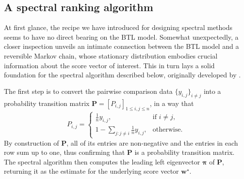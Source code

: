 %



\subsection{A spectral ranking algorithm \label{subsec:Spectral-method-for-ranking}}

At first glance, the recipe we have introduced for designing  spectral methods seems to have no direct bearing on the BTL model.
Somewhat unexpectedly, a closer inspection unveils an intimate connection between the BTL model and a reversible Markov chain,
whose stationary distribution embodies crucial information about the score vector of interest.
This in turn lays a solid foundation for the spectral algorithm described below, originally developed by \citet{negahban2016rank}.

The first step is to convert the pairwise comparison data
$\{y_{i,j}\}_{i\neq j}$ into a probability transition matrix $\bm{P}=[P_{i,j}]_{1\leq i,j\leq n}$, in a way that
%
\begin{equation}
P_{i,j}=\begin{cases}
\frac{1}{n}y_{i,j}, & \text{if }i\neq j,\\
1-\sum_{j:j\neq i}\frac{1}{n}y_{i,j}, & \text{otherwise}.
\end{cases}
\label{defn:ranking-P-empirical}
\end{equation}
%
By construction of $\bm{P}$, all of its entries are non-negative and the entries in each row sum up to one,
thus confirming that  $\bm{P}$ is a probability transition matrix.
The spectral algorithm then computes the leading left eigenvector $\bm{\pi}$ of  $\bm{P}$, returning it as
 the estimate for the underlying score vector $\bm{w}^{\star}$.

